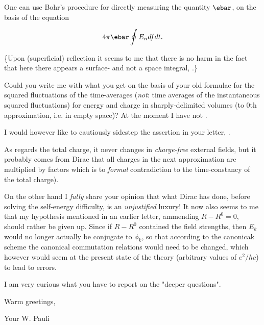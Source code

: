 \documentclass{article}
\newcommand{\uequ}[1]{
\begin{align*}
#1
\end{align*}
}
\begin{document}
One can use Bohr's procedure for directly measuring the quantity $\ebar$, on the basis of the equation
\uequ{
4\pi\ebar \oint E_n {df}{dt}.
}
\{Upon (superficial) reflection it seems to me that there is no harm in the fact that here there appears a surface- and not a space integral, .\}

Could you write me with what you get on the basis of your old formulae for the squared fluctuations of the time-averages (\textit{not}: time averages of the instantaneous squared fluctuations) for energy and charge in sharply-delimited volumes (to 0th approximation, i.e. in empty space)? At the moment I have not .

I would however like to cautiously sidestep the assertion in your letter, .

As regards the total charge, it never changes in \textit{charge-free} external fields, but it probably comes from Dirac that all charges in the next approximation are multiplied by factors 
which is to \textit{formal} contradiction to the time-constancy of the total charge).

On the other hand I \textit{fully} share your opinion that what Dirac has done, before solving the self-energy difficulty, is an \textit{unjustified} luxury! It now also seems to me that my hypothesis mentioned in an earlier letter, ammending $R-R^0=0$, should rather be given up. Since if $R-R^0$ contained the field strengths, then $E_k$ would no longer actually be conjugate to $\phi_k$, so that according to the canonicak scheme the canonical commutation relations would need to be changed, which however would seem at the present state of the theory (arbitrary values of $e^2/hc$) to lead to errors.

I am very curious what you have to report on the "deeper questions".

Warm greetings,

Your W. Pauli

\date{February 15, 1934}
\end{document}
